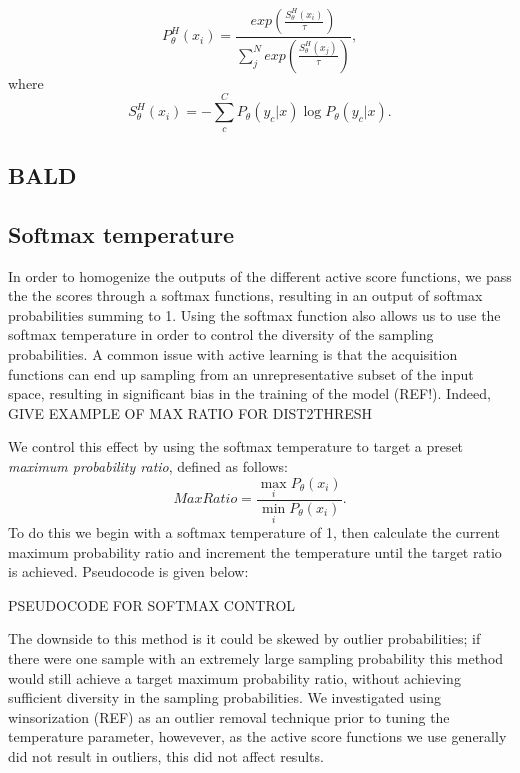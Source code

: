 \begin{equation}
P_{\theta}^{H} (x_i) = \frac{exp(\frac{S^{H}_{\theta}(x_i)}{\tau})}{\sum_{j}^{N} exp(\frac{S^{H}_{\theta}(x_j)}{\tau})},
\end{equation}
where
\begin{equation}
S^{H}_{\theta}(x_i) = - \sum_{c}^{C} P_{\theta}(y_c|x)\log P_{\theta}(y_c|x).
\end{equation}

\subsection{BALD}


\subsection{Softmax temperature}\label{Methods_SoftmaxTemperature}
In order to homogenize the outputs of the different active score functions, we pass the the scores through a softmax functions, resulting in an output of softmax probabilities summing to 1. Using the softmax function also allows us to use the softmax temperature in order to control the diversity of the sampling probabilities. A common issue with active learning is that the acquisition functions can end up sampling from an unrepresentative subset of the input space, resulting in significant bias in the training of the model (REF!). Indeed, GIVE EXAMPLE OF MAX RATIO FOR DIST2THRESH

We control this effect by using the softmax temperature to target a preset \textit{maximum probability ratio}, defined as follows:
\begin{equation}
Max Ratio = \frac{\max_{i} P_\theta(x_i)}{\min_{i} P_\theta(x_i)}.
\end{equation}
To do this we begin with a softmax temperature of 1, then calculate the current maximum probability ratio and increment the temperature until the target ratio is achieved. Pseudocode is given below:

PSEUDOCODE FOR SOFTMAX CONTROL

The downside to this method is it could be skewed by outlier probabilities; if there were one sample with an extremely large sampling probability this method would still achieve a target maximum probability ratio, without achieving sufficient diversity in the sampling probabilities. We investigated using winsorization (REF) as an outlier removal technique prior to tuning the temperature parameter, howevever, as the active score functions we use generally did not result in outliers, this did not affect results.  

